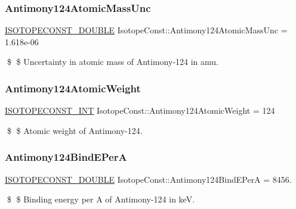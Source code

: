 \subsubsection{\texorpdfstring{Antimony124\+Atomic\+Mass\+Unc}{Antimony124AtomicMassUnc}}
{\footnotesize\ttfamily \mbox{\hyperlink{group___isotope_const-_macros_ga8f45a7272ce02c0b4c65c44636ed719a}{I\+S\+O\+T\+O\+P\+E\+C\+O\+N\+S\+T\+\_\+\+D\+O\+U\+B\+LE}} Isotope\+Const\+::\+Antimony124\+Atomic\+Mass\+Unc = 1.\+618e-\/06}

\$ \$ Uncertainty in atomic mass of Antimony-\/124 in amu. \mbox{\label{group___isotope_const-_antimony-_sb124_gaf78e8d3014b438099764de4a59ce5384}} 
\subsubsection{\texorpdfstring{Antimony124\+Atomic\+Weight}{Antimony124AtomicWeight}}
{\footnotesize\ttfamily \mbox{\hyperlink{group___isotope_const-_macros_ga5f18360b3e99483a35c32d789e62621c}{I\+S\+O\+T\+O\+P\+E\+C\+O\+N\+S\+T\+\_\+\+I\+NT}} Isotope\+Const\+::\+Antimony124\+Atomic\+Weight = 124}

\$ \$ Atomic weight of Antimony-\/124. \mbox{\label{group___isotope_const-_antimony-_sb124_ga671d168a14c920c49acc6e23f8e3bae2}} 
\subsubsection{\texorpdfstring{Antimony124\+Bind\+E\+PerA}{Antimony124BindEPerA}}
{\footnotesize\ttfamily \mbox{\hyperlink{group___isotope_const-_macros_ga8f45a7272ce02c0b4c65c44636ed719a}{I\+S\+O\+T\+O\+P\+E\+C\+O\+N\+S\+T\+\_\+\+D\+O\+U\+B\+LE}} Isotope\+Const\+::\+Antimony124\+Bind\+E\+PerA = 8456.}

\$ \$ Binding energy per A of Antimony-\/124 in keV. \mbox{\label{group___isotope_const-_antimony-_sb124_ga4f395ebc1429a9f680ac182ec2fbd9fc}} 
